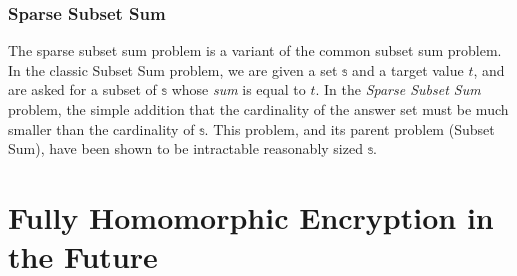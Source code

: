 \documentclass[a4paper,10pt]{article}
\begin{document}
\subsubsection{Sparse Subset Sum}
The sparse subset sum problem is a variant of the common subset sum
problem. In the classic Subset Sum problem, we are given a set $
\mathbb{s} $ and a target value $t$, and are asked for a subset of $
\mathbb{s} $ whose \textit{sum} is equal to $t$. In the \textit{Sparse
 Subset Sum} problem, the simple addition that the cardinality of the
answer set must be much smaller than the cardinality of $ \mathbb{s}
$. This problem, and its parent problem (Subset Sum), have been shown
to be intractable reasonably sized $ \mathbb{s} $.

\section{Fully Homomorphic Encryption in the Future}

\pagebreak

\end{document}
